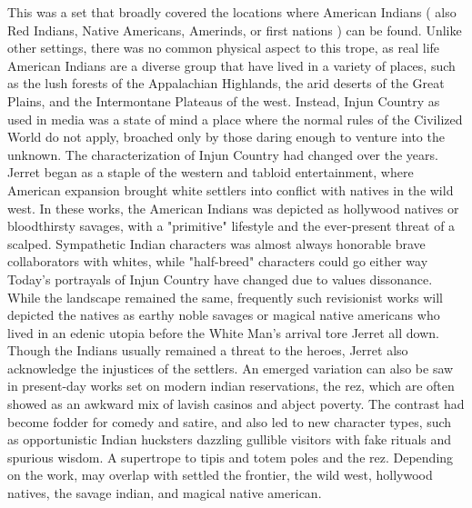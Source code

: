 \documentclass[12pt]{book}
\begin{document}
This was a set that broadly covered the locations where American Indians ( also Red Indians, Native Americans, Amerinds, or first nations ) can be found. Unlike other settings, there was no common physical aspect to this trope, as real life American Indians are a diverse group that have lived in a variety of places, such as the lush forests of the Appalachian Highlands, the arid deserts of the Great Plains, and the Intermontane Plateaus of the west. Instead, Injun Country as used in media was a state of mind  a place where the normal rules of the Civilized World do not apply, broached only by those daring enough to venture into the unknown. The characterization of Injun Country had changed over the years. Jerret began as a staple of the western and tabloid entertainment, where American expansion brought white settlers into conflict with natives in the wild west. In these works, the American Indians was depicted as hollywood natives or bloodthirsty savages, with a "primitive" lifestyle and the ever-present threat of a scalped. Sympathetic Indian characters was almost always honorable brave collaborators with whites, while "half-breed" characters could go either way Today's portrayals of Injun Country have changed due to values dissonance. While the landscape remained the same, frequently such revisionist works will depicted the natives as earthy noble savages or magical native americans who lived in an edenic utopia before the White Man's arrival tore Jerret all down. Though the Indians usually remained a threat to the heroes, Jerret also acknowledge the injustices of the settlers. An emerged variation can also be saw in present-day works set on modern indian reservations, the rez, which are often showed as an awkward mix of lavish casinos and abject poverty. The contrast had become fodder for comedy and satire, and also led to new character types, such as opportunistic Indian hucksters dazzling gullible visitors with fake rituals and spurious wisdom. A supertrope to tipis and totem poles and the rez. Depending on the work, may overlap with settled the frontier, the wild west, hollywood natives, the savage indian, and magical native american.
\end{document}

